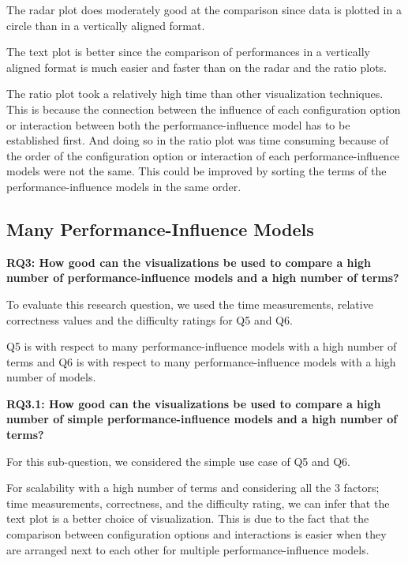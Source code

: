 The radar plot does moderately good at the comparison since data is plotted in a circle than in a vertically aligned format.

The text plot is better since the comparison of performances in a vertically aligned format is much easier and faster than on the radar and the ratio plots.

The ratio plot took a relatively high time than other visualization techniques. This is because the connection between the influence of each configuration option or interaction between both the performance-influence model has to be established first. And doing so in the ratio plot was time consuming because of the order of the configuration option or interaction of each performance-influence models were not the same. This could be improved by sorting the terms of the performance-influence models in the same order.


\subsection*{Many Performance-Influence Models}

\vskip 0.2in
\begin{mdframed}
\textbf{RQ3: How good can the visualizations be used to compare a high number of performance-influence models and a high number of terms?}
\end{mdframed}

To evaluate this research question, we used the time measurements, relative correctness values and the difficulty ratings for Q5 and Q6.

Q5 is with respect to many performance-influence models with a high number of terms and Q6 is with respect to many performance-influence models with a high number of models.

\begin{mdframed} 
\textbf{RQ3.1: How good can the visualizations be used to compare a high number of simple performance-influence models and a high number of terms?}
\end{mdframed}

For this sub-question, we considered the simple use case of Q5 and Q6.

For scalability with a high number of terms and considering all the 3 factors; time measurements, correctness, and the difficulty rating, we can infer that the text plot is a better choice of visualization. This is due to the fact that the comparison between configuration options and interactions is easier when they are arranged next to each other for multiple performance-influence models.

